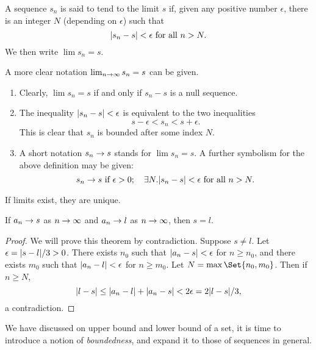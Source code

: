 \documentclass[main.tex]{subfiles}
\begin{document}
	\begin{definition}
		A sequence $s_n$ is said to tend to the limit $s$ if, given any positive number $\epsilon$, there is an integer $N$ (depending on $\epsilon$) such that
		\begin{equation*}
		\abs*{s_n - s} < \epsilon \text{ for all } n > N.
		\end{equation*}
		We then write $\lim s_n = s$.
	\end{definition}
	A more clear notation $\lim_{n \ra \infty} s_n = s$ can be given.
	\begin{note}
		\begin{enumerate}
			\item Clearly, $\lim s_n = s$ if and only if $s_n - s$ is a null sequence.
			
			\item The inequality $\abs*{s_n - s} < \epsilon$ is equivalent to the two inequalities
			\begin{equation*}
			s - \epsilon < s_n < s + \epsilon.
			\end{equation*}
			This is clear that $s_n$ is bounded after some index $N$.
			
			\item A short notation $s_n \ra s$ stands for $\lim s_n = s$. A further symbolism for the above definition may be given:
			\begin{equation*}
			s_n \ra s \text{ if } \epsilon >0;\quad \exists N.\abs*{s_n - s} < \epsilon \text{ for all } n > N.
			\end{equation*}
		\end{enumerate}
	\end{note}
	If limits exist, they are unique.
	\begin{theorem}
		If $a_n \ra s$ as $n \ra \infty$ and $a_n \ra l$ as $n \ra \infty$, then $s = l$.
	\end{theorem}
	\begin{proof}
		We will prove this theorem by contradiction. Suppose $s \neq l$. Let $\epsilon = \abs{s - l}/3 > 0$. There exists $n_0$ such that $\abs{a_n - s} < \epsilon$ for $n \geq n_0$, and there exists $m_0$ such that $\abs{a_n - l} < \epsilon$ for $n \geq m_0$. Let $N = \max\Set{n_0 , m_0}$. Then if $n \geq N$,
		\begin{equation*}
		\abs{l - s} \leq \abs{a_n - l} + \abs{a_n - s} < 2\epsilon = 2\abs{l - s}/3,
		\end{equation*}
		a contradiction.
	\end{proof}
	We have discussed on upper bound and lower bound of a set, it is time to introduce a notion of \textit{boundedness}, and expand it to those of sequences in general.
\end{document}
